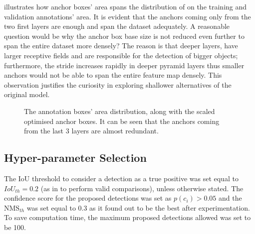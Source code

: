   illustrates how anchor boxes' area spans the distribution of on the training and validation annotations' area. It is evident that the anchors coming only from the two first layers are enough and span the dataset adequately. A reasonable question would be why the anchor box base size is not reduced even further to span the entire dataset more densely? The reason is that deeper layers, have larger receptive fields and are responsible for the detection of bigger objects; furthermore, the stride increases rapidly in deeper pyramid layers thus smaller anchors would not be able to span the entire feature map densely. This observation justifies the curiosity in exploring shallower alternatives of the original model.
 
\begin{figure}[!htb]
  \centering
  \caption{The annotation boxes' area distribution, along with the scaled optimised anchor boxes. It can be seen that the anchors coming from the last 3 layers are almost redundant.}
  \label{fig1}
\end{figure}

\subsection{Hyper-parameter Selection}
The IoU threshold to consider a detection as a true positive was set equal to $IoU_{th} = 0.2$ (as in \cite{bargoti2017deep} to perform valid comparisons), unless otherwise stated. The confidence score for the proposed detections was set as $p(c_i) > 0.05$ and the $\text{NMS}_{th}$ was set equal to 0.3 as it found out to be the best after experimentation. To save computation time, the maximum proposed detections allowed was set to be 100. 

